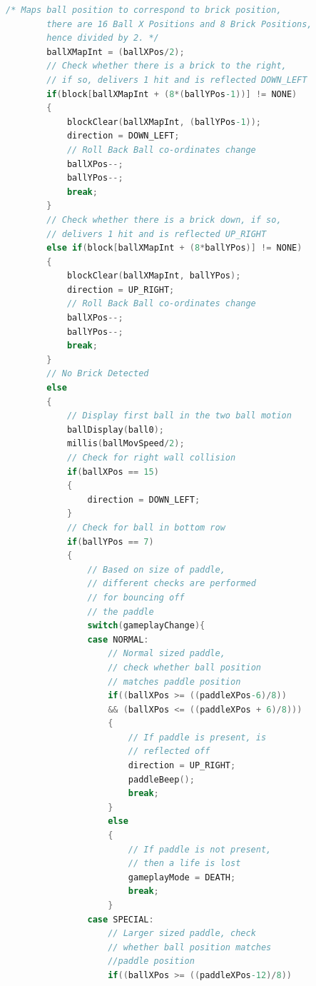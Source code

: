 \documentclass{article}
\begin{document}
\begin{lstlisting}[basicstyle = \small, language = C]
        /* Maps ball position to correspond to brick position,
        there are 16 Ball X Positions and 8 Brick Positions, 
        hence divided by 2. */
        ballXMapInt = (ballXPos/2);
        // Check whether there is a brick to the right,
        // if so, delivers 1 hit and is reflected DOWN_LEFT
        if(block[ballXMapInt + (8*(ballYPos-1))] != NONE)
        {
            blockClear(ballXMapInt, (ballYPos-1));
            direction = DOWN_LEFT;
            // Roll Back Ball co-ordinates change
            ballXPos--;
            ballYPos--;
            break;
        }
        // Check whether there is a brick down, if so,
        // delivers 1 hit and is reflected UP_RIGHT
        else if(block[ballXMapInt + (8*ballYPos)] != NONE)
        {
            blockClear(ballXMapInt, ballYPos);
            direction = UP_RIGHT;
            // Roll Back Ball co-ordinates change
            ballXPos--;
            ballYPos--;
            break;
        }
        // No Brick Detected
        else
        {
            // Display first ball in the two ball motion
            ballDisplay(ball0);
            millis(ballMovSpeed/2);
            // Check for right wall collision
            if(ballXPos == 15)
            {
                direction = DOWN_LEFT;
            }
            // Check for ball in bottom row
            if(ballYPos == 7)
            {
                // Based on size of paddle, 
                // different checks are performed 
                // for bouncing off 
                // the paddle
                switch(gameplayChange){
                case NORMAL:
                    // Normal sized paddle, 
                    // check whether ball position 
                    // matches paddle position
                    if((ballXPos >= ((paddleXPos-6)/8)) 
                    && (ballXPos <= ((paddleXPos + 6)/8)))
                    {
                        // If paddle is present, is 
                        // reflected off
                        direction = UP_RIGHT;
                        paddleBeep();
                        break;
                    }
                    else
                    {
                        // If paddle is not present, 
                        // then a life is lost
                        gameplayMode = DEATH;
                        break;
                    }
                case SPECIAL:
                    // Larger sized paddle, check 
                    // whether ball position matches 
                    //paddle position
                    if((ballXPos >= ((paddleXPos-12)/8)) 

\end{lstlisting}
\end{document}
